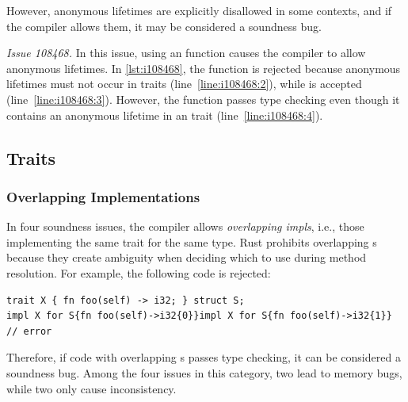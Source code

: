 \noindent
%
However, anonymous lifetimes are explicitly disallowed in some contexts, and if
the compiler allows them, it may be considered a soundness bug.

{\it Issue 108468.}
%
In this issue, using an  function causes the compiler to allow
anonymous lifetimes.
%
In \cref{lst:i108468}, the function  is rejected because anonymous
lifetimes must not occur in  traits (line~\ref{line:i108468:2}), while
 is accepted (line~\ref{line:i108468:3}).
%
However, the  function  passes type checking even though it
contains an anonymous lifetime in an  trait (line~\ref{line:i108468:4}).
%
%

\subsection{Traits}

\subsubsection{Overlapping Implementations}

In four soundness issues, the compiler allows \emph{overlapping impls}, i.e.,
those implementing the same trait for the same type.
%
Rust prohibits overlapping s because they create ambiguity when deciding
which  to use during method resolution.
%
For example, the following code is rejected:

\vspace{-0.5em}
\begin{lstlisting}
trait X { fn foo(self) -> i32; } struct S;
impl X for S{fn foo(self)->i32{0}}impl X for S{fn foo(self)->i32{1}} // error
\end{lstlisting}
\vspace{-0.5em}

\noindent
%
Therefore, if code with overlapping s passes type checking, it can be
considered a soundness bug.
%
Among the four issues in this category, two lead to memory bugs, while two
only cause inconsistency.

